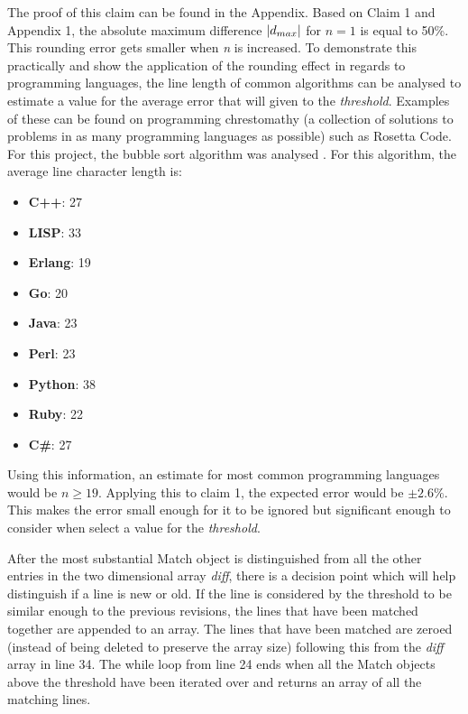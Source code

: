 The proof of this claim can be found in the Appendix. Based on Claim 1 and Appendix 1, the absolute maximum difference $\lvert d_{max}\rvert$ for $n = 1$ is equal to 50\%. This rounding error gets smaller when \textit{n} is increased. To demonstrate this practically and show the application of the rounding effect in regards to programming languages, the line length of common algorithms can be analysed to estimate a value for the average error that will given to the \textit{threshold}. Examples of these can be found on programming chrestomathy (a collection of solutions to problems in as many programming languages as possible) such as Rosetta Code. For this project, the bubble sort algorithm was analysed \citep{rosetta_code_2021}. For this algorithm, the average line character length is:
\begin{itemize}
    \item \textbf{C++}: 27 
    \item \textbf{LISP}: 33 
    \item \textbf{Erlang}: 19 
    \item \textbf{Go}: 20 
    \item \textbf{Java}: 23 
    \item \textbf{Perl}: 23 
    \item \textbf{Python}: 38 
    \item \textbf{Ruby}: 22 
    \item \textbf{C\#}: 27 
\end{itemize}
Using this information, an estimate for most common programming languages would be $n \geq 19$. Applying this to claim 1, the expected error would be $\pm 2.6\%$. This makes the error small enough for it to be ignored but significant enough to consider when select a value for the \textit{threshold}. 

After the most substantial Match object is distinguished from all the other entries in the two dimensional array \textit{diff}, there is a decision point which will help distinguish if a line is new or old. If the line is considered by the threshold to be similar enough to the previous revisions, the lines that have been matched together are appended to an array. The lines that have been matched are zeroed (instead of being deleted to preserve the array size) following this from the \textit{diff} array in line 34. The while loop from line 24 ends when all the Match objects above the threshold have been iterated over and returns an array of all the matching lines.

